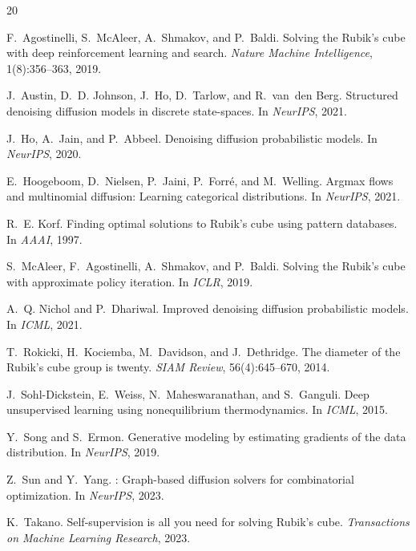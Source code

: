 \documentclass[11pt]{article}
\begin{document}

\begin{thebibliography}{20}

F.~Agostinelli, S.~McAleer, A.~Shmakov, and P.~Baldi.
\newblock Solving the {R}ubik's cube with deep reinforcement learning and search.
\newblock \emph{Nature Machine Intelligence}, 1(8):356--363, 2019.

J.~Austin, D.~D. Johnson, J.~Ho, D.~Tarlow, and R.~van~den Berg.
\newblock Structured denoising diffusion models in discrete state-spaces.
\newblock In \emph{NeurIPS}, 2021.

J.~Ho, A.~Jain, and P.~Abbeel.
\newblock Denoising diffusion probabilistic models.
\newblock In \emph{NeurIPS}, 2020.

E.~Hoogeboom, D.~Nielsen, P.~Jaini, P.~Forr\'e, and M.~Welling.
\newblock Argmax flows and multinomial diffusion: Learning categorical distributions.
\newblock In \emph{NeurIPS}, 2021.

R.~E. Korf.
\newblock Finding optimal solutions to {R}ubik's cube using pattern databases.
\newblock In \emph{AAAI}, 1997.

S.~McAleer, F.~Agostinelli, A.~Shmakov, and P.~Baldi.
\newblock Solving the {R}ubik's cube with approximate policy iteration.
\newblock In \emph{ICLR}, 2019.

A.~Q. Nichol and P.~Dhariwal.
\newblock Improved denoising diffusion probabilistic models.
\newblock In \emph{ICML}, 2021.

T.~Rokicki, H.~Kociemba, M.~Davidson, and J.~Dethridge.
\newblock The diameter of the {R}ubik's cube group is twenty.
\newblock \emph{SIAM Review}, 56(4):645--670, 2014.

J.~Sohl-Dickstein, E.~Weiss, N.~Maheswaranathan, and S.~Ganguli.
\newblock Deep unsupervised learning using nonequilibrium thermodynamics.
\newblock In \emph{ICML}, 2015.

Y.~Song and S.~Ermon.
\newblock Generative modeling by estimating gradients of the data distribution.
\newblock In \emph{NeurIPS}, 2019.

Z.~Sun and Y.~Yang.
: Graph-based diffusion solvers for combinatorial optimization.
\newblock In \emph{NeurIPS}, 2023.

K.~Takano.
\newblock Self-supervision is all you need for solving {R}ubik's cube.
\newblock \emph{Transactions on Machine Learning Research}, 2023.

\end{thebibliography}
\end{document}
